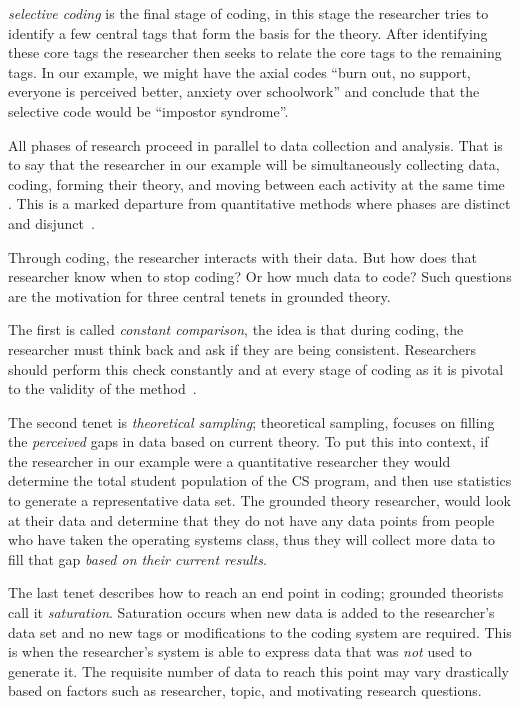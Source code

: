 \documentclass[sigconf]{acmart}
\begin{document}
\emph{selective coding} is the final stage of coding, in this stage the
researcher tries to identify a few central tags that form the basis for the
theory. After identifying these core tags the researcher then seeks to relate
the core tags to the remaining tags. In our example, we might have
the axial codes ``burn out, no support, everyone is perceived better, anxiety
over schoolwork'' and conclude that the selective code would be
``impostor syndrome''.
 
All phases of research proceed in parallel to data collection and analysis. That
is to say that the researcher in our example will be simultaneously collecting
data, coding, forming their theory, and moving between each activity at the
same time . This is a marked departure from quantitative methods where phases
are distinct and disjunct~\cite{Strauss67discoveryof}.


Through coding, the researcher interacts with their data. But how does that
researcher know when to stop coding? Or how much data to code? Such questions
are the motivation for three central tenets in grounded theory.
 
The first is called \emph{constant comparison}, the idea is that during coding,
the researcher must think back and ask if they are being consistent. Researchers
should perform this check constantly and at every stage of coding as it is
pivotal to the validity of the method~\cite{Strauss67discoveryof}.
 
The second tenet is \emph{theoretical sampling}; theoretical sampling, focuses
on filling the \emph{perceived} gaps in data based on current theory. To put
this into context, if the researcher in our example were a quantitative
researcher they would determine the total student population of the CS program,
and then use statistics to generate a representative data set. The grounded
theory researcher, would look at their data and determine that they do not have
any data points from people who have taken the operating systems class, thus
they will collect more data to fill that gap \emph{based on their current
  results}.
 
The last tenet describes how to reach an end point in coding; grounded theorists
call it \emph{saturation}. Saturation occurs when new data is added to the
researcher's data set and no new tags or modifications to the coding system are
required. This is when the researcher's system is able to express data that was
\emph{not} used to generate it. The requisite number of data to reach this point
may vary drastically based on factors such as researcher, topic, and motivating
research questions.
\end{document}
